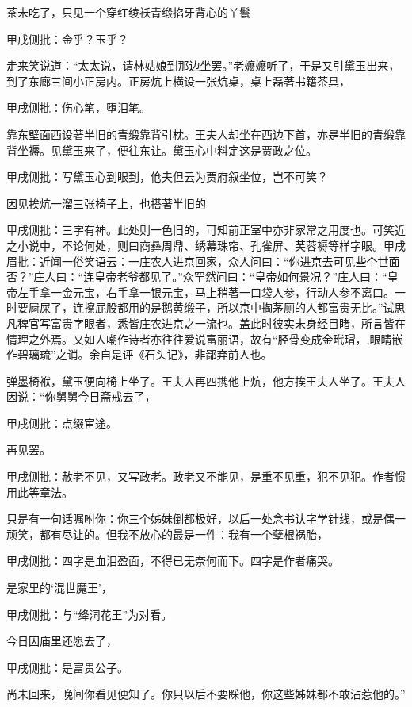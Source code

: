 \begin{parag}
    茶未吃了，只见一个穿红绫袄青缎掐牙背心的丫鬟\begin{note}甲戌侧批：金乎？玉乎？\end{note}走来笑说道：“太太说，请林姑娘到那边坐罢。”老嬷嬷听了，于是又引黛玉出来，到了东廊三间小正房内。正房炕上横设一张炕桌，桌上磊著书籍茶具，\begin{note}甲戌侧批：伤心笔，堕泪笔。\end{note}靠东壁面西设著半旧的青缎靠背引枕。王夫人却坐在西边下首，亦是半旧的青缎靠背坐褥。见黛玉来了，便往东让。黛玉心中料定这是贾政之位。\begin{note}甲戌侧批：写黛玉心到眼到，伧夫但云为贾府叙坐位，岂不可笑？\end{note}因见挨炕一溜三张椅子上，也搭著半旧的\begin{note}甲戌侧批：三字有神。此处则一色旧的，可知前正室中亦非家常之用度也。可笑近之小说中，不论何处，则曰商彝周鼎、绣幕珠帘、孔雀屏、芙蓉褥等样字眼。甲戌眉批：近闻一俗笑语云：一庄农人进京回家，众人问曰：“你进京去可见些个世面否？”庄人曰：“连皇帝老爷都见了。”众罕然问曰：“皇帝如何景况？”庄人曰：“皇帝左手拿一金元宝，右手拿一银元宝，马上稍著一口袋人参，行动人参不离口。一时要屙屎了，连擦屁股都用的是鹅黄缎子，所以京中掏茅厕的人都富贵无比。”试思凡稗官写富贵字眼者，悉皆庄农进京之一流也。盖此时彼实未身经目睹，所言皆在情理之外焉。又如人嘲作诗者亦往往爱说富丽语，故有“胫骨变成金玳瑁，,眼睛嵌作碧璃琉”之诮。余自是评《石头记》，非鄙弃前人也。\end{note}弹墨椅袱，黛玉便向椅上坐了。王夫人再四携他上炕，他方挨王夫人坐了。王夫人因说：“你舅舅今日斋戒去了，\begin{note}甲戌侧批：点缀宦途。\end{note}再见罢。\begin{note}甲戌侧批：赦老不见，又写政老。政老又不能见，是重不见重，犯不见犯。作者惯用此等章法。\end{note}只是有一句话嘱咐你：你三个姊妹倒都极好，以后一处念书认字学针线，或是偶一顽笑，都有尽让的。但我不放心的最是一件：我有一个孽根祸胎，\begin{note}甲戌侧批：四字是血泪盈面，不得已无奈何而下。四字是作者痛哭。\end{note}是家里的‘混世魔王’，\begin{note}甲戌侧批：与“绛洞花王”为对看。\end{note}今日因庙里还愿去了，\begin{note}甲戌侧批：是富贵公子。\end{note}尚未回来，晚间你看见便知了。你只以后不要睬他，你这些姊妹都不敢沾惹他的。”
\end{parag}


